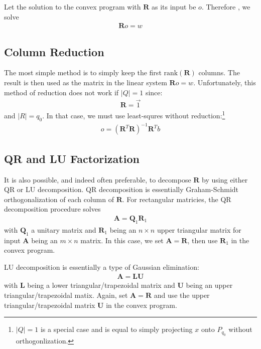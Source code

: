 Let the solution to the convex program with $\bm{R}$ as its input be $o$. Therefore , we solve
\begin{align}
    \bm{R}o = w
\end{align}

    \subsection{Column Reduction}
    The most simple method is to simply keep the first $\text{rank}(\bm{R})$ columns. The result is then used as the matrix in the linear system $\bm{R}o = w$. Unfortunately, this method of reduction does not work if $|Q| = 1$ since:
    \begin{align*}
        \bm{R} = \overrightarrow{1}
    \end{align*}
    and $|R| = q_{0}$. In that case, we must use least-squres without reduction:\footnote{$|Q| = 1$ is a special case and is equal to simply projecting $x$ onto $P_{q_0}$ without orthogonlization.}
    \begin{align*}
        o = ( \bm{R}^T\bm{R} )^{-1} \bm{R}^T b
    \end{align*}

    \subsection{QR and LU Factorization}
    It is also possible, and indeed often preferable, to decompose $\bm{R}$ by using either QR or LU decomposition. QR decomposition is essentially Graham-Schmidt orthogonalization of each column of $\bm{R}$. For rectangular matricies, the QR decomposition procedure solves
    \begin{align}
        \bm{A} = \bm{Q}_1 \bm{R}_1
    \end{align}
    with $\bm{Q}_1$ a unitary matrix and $\bm{R}_1$ being an $n \times n$ upper triangular matrix for input $\bm{A}$ being an $m \times n$ matrix. In this case, we set $\bm{A} = \bm{R}$, then use $\bm{R}_1$ in the convex program.

    LU decomposition is essentially a type of Gaussian elimination:
    \begin{align}
        \bm{A} = \bm{L}\bm{U}
    \end{align}
    with $\bm{L}$ being a lower triangular/trapezoidal matrix and $\bm{U}$ being an upper triangular/trapezoidal matix. Again, set $\bm{A} = \bm{R}$ and use the upper triangular/trapezoidal matrix $\bm{U}$ in the convex program.



